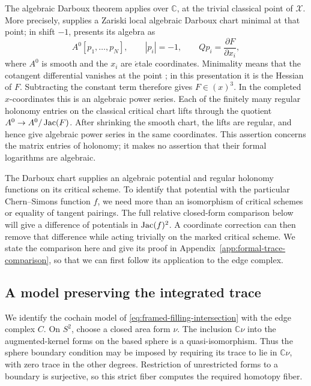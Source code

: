 The algebraic Darboux theorem applies over \(\mathbb C\), at the trivial
classical point of \(\mathcal X\).  More precisely,
\cite[Theorem~5.18(i)]{BBJ2019} supplies a Zariski local algebraic
Darboux chart minimal at that point; in shift \(-1\),
\cite[Example~5.15]{BBJ2019} presents its algebra as
\begin{equation}
\label{eq:algebraic-darboux-chart}
 A^0[p_1,\ldots,p_N],\qquad |p_i|=-1,
 \qquad Qp_i=\frac{\partial F}{\partial x_i},
\end{equation}
where \(A^0\) is smooth and the \(x_i\) are \(\acute{e}\)tale coordinates.
Minimality means that the cotangent differential vanishes at the point
\cite[Definition~2.13]{BBJ2019}; in this presentation it is the Hessian
of \(F\).  Subtracting the constant term therefore gives \(F\in(x)^3\).
In the completed \(x\)-coordinates this is an algebraic power series.
Each of the finitely many regular holonomy entries on the classical
critical chart lifts through the quotient \(A^0\to A^0/\operatorname{Jac}(F)\).
After shrinking the smooth chart, the lifts are regular, and hence give
algebraic power series in the same coordinates.  This assertion concerns
the matrix entries of holonomy; it makes no assertion that their formal
logarithms are algebraic.

The Darboux chart supplies an algebraic potential and regular holonomy
functions on its critical scheme.  To identify that potential with the
particular Chern--Simons function \(f\), we need more than an
isomorphism of critical schemes or equality of tangent pairings.
The full relative closed-form comparison below will give a difference
of potentials in \(\operatorname{Jac}(f)^2\).  A coordinate correction can then remove
that difference while acting trivially on the marked critical scheme.
We state the comparison here and give its proof in
Appendix~\ref{app:formal-trace-comparison}, so that we can first follow
its application to the edge complex.



\subsection{A model preserving the integrated trace}

We identify the cochain model of
\eqref{eq:framed-filling-intersection} with the edge complex \(C\).
On \(S^2\), choose a closed area form \(\nu\).  The inclusion
\(\mathbb C\nu\) into the augmented-kernel forms on the based sphere is
a quasi-isomorphism.  Thus the sphere boundary condition may be imposed
by requiring its trace to lie in \(\mathbb C\nu\), with zero trace in
the other degrees.  Restriction of unrestricted forms to a boundary is
surjective, so this strict fiber computes the required homotopy fiber.

